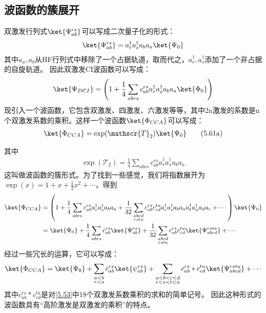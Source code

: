 \subsection{波函数的簇展开}
双激发行列式$\ket{\Psi^{rs}_{ab}}$可以写成二次量子化的形式：
\begin{align*}
    \ket{\Psi^{rs}_{ab}}=a^{\dagger}_ra^{\dagger}_sa_ba_a\ket{\Psi_0}
\end{align*}
其中$a_a,a_b$从HF行列式中移除了一个占据轨道，取而代之，$a^{\dagger}_r,a^{\dagger}_s$添加了一个非占据的自旋轨道。
因此双激发CI波函数可以写成：
\begin{align*}
    \ket{\Psi_{DCI}}=\left(1+\frac{1}{4}\sum_{abrs}c^{rs}_{ab}a^{\dagger}_ra^{\dagger}_sa_ba_a\ket{\Phi_0}\right)
\end{align*}
现引入一个波函数，它包含双激发、四激发、六激发等等，其中2n激发的系数是n个双激发系数的乘积。这样一个波函数$\ket{\Phi_{CCA}}$可以写成：
\begin{align}
    \ket{\Phi_{CCA}}=\exp(\mathscr{T}_2)\ket{\Psi_0}\tag{5.61a}
\end{align}
\addtocounter{equation}{1}
其中
\begin{align}
    \exp(\mathscr{T}_2)=\frac{1}{4}\sum_{abrs}c^{rs}_{ab}a^{\dagger}_ra^{\dagger}_sa_ba_a\tag{5.61b}
\end{align}
这叫做波函数的簇形式。为了找到一些感觉，我们将指数展开为$\exp(x)=1+x+\frac{1}{2}x^2+\cdots$，得到
\begin{align*}
    \ket{\Phi_{CCA}}&=\left(1+\frac{1}{4}\sum_{abrs}c^{rs}_{ab}a^{\dagger}_ra^{\dagger}_sa_ba_a +\frac{1}{32}\sum_{\substack{abcd\\rstu}}c^{rs}_{ab}c^{tu}_{cd}a^{\dagger}_ra^{\dagger}_sa_ba_aa^{\dagger}_ta^{\dagger}_ua_da_c+\cdots\right)\ket{\Psi_0}\\
    &=\ket{\Psi_0}+\frac{1}{4}\sum_{abrs}c^{rs}_{ab}\ket{\Psi^{rs}_{ab}}+\frac{1}{32}\sum_{\substack{abcd\\rstu}}c^{rs}_{ab}c^{tu}_{cd}\ket{\Psi^{rstu}_{abcd}}+\cdots
\end{align*}
经过一些冗长的运算，它可以写成：
\begin{align}
    \label{5.62}
    \ket{\Phi_{CCA}}=\ket{\Psi_0}+\sum_{\substack{a<b\\r<s}}c^{rs}_{ab}\ket{\psi^{rs}_{ab}}+\sum_{\substack{a<b<c<d\\r<s<t<u}}c^{rs}_{ab}*c^{tu}_{cd}\ket{\Psi^{rstu}_{abcd}}+\cdots
\end{align}
其中$c^{rs}_{ab}*c^{tu}_{cd}$是对\autoref{5.53}中18个双激发系数乘积的求和的简单记号。
因此这种形式的波函数具有“高阶激发是双激发的乘积”的特点。


